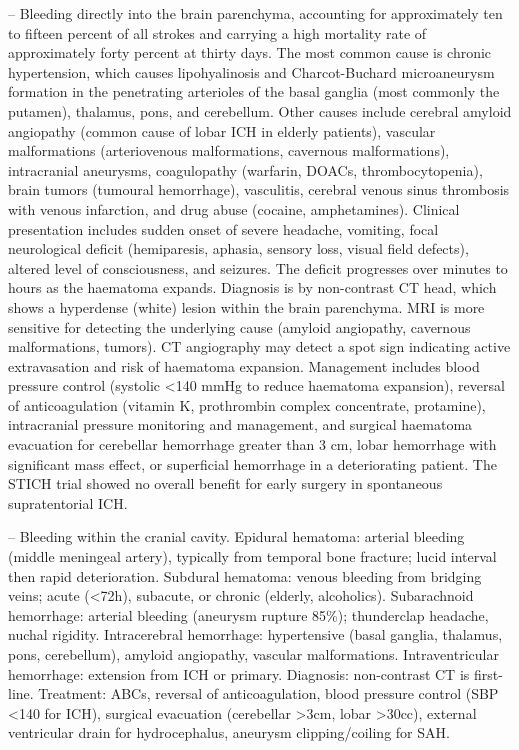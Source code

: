 -- Bleeding directly into the brain parenchyma, accounting for approximately ten to fifteen percent of all strokes and carrying a high mortality rate of approximately forty percent at thirty days. The most common cause is chronic hypertension, which causes lipohyalinosis and Charcot-Buchard microaneurysm formation in the penetrating arterioles of the basal ganglia (most commonly the putamen), thalamus, pons, and cerebellum. Other causes include cerebral amyloid angiopathy (common cause of lobar ICH in elderly patients), vascular malformations (arteriovenous malformations, cavernous malformations), intracranial aneurysms, coagulopathy (warfarin, DOACs, thrombocytopenia), brain tumors (tumoural hemorrhage), vasculitis, cerebral venous sinus thrombosis with venous infarction, and drug abuse (cocaine, amphetamines). Clinical presentation includes sudden onset of severe headache, vomiting, focal neurological deficit (hemiparesis, aphasia, sensory loss, visual field defects), altered level of consciousness, and seizures. The deficit progresses over minutes to hours as the haematoma expands. Diagnosis is by non-contrast CT head, which shows a hyperdense (white) lesion within the brain parenchyma. MRI is more sensitive for detecting the underlying cause (amyloid angiopathy, cavernous malformations, tumors). CT angiography may detect a spot sign indicating active extravasation and risk of haematoma expansion. Management includes blood pressure control (systolic <140 mmHg to reduce haematoma expansion), reversal of anticoagulation (vitamin K, prothrombin complex concentrate, protamine), intracranial pressure monitoring and management, and surgical haematoma evacuation for cerebellar hemorrhage greater than 3 cm, lobar hemorrhage with significant mass effect, or superficial hemorrhage in a deteriorating patient. The STICH trial showed no overall benefit for early surgery in spontaneous supratentorial ICH.

-- Bleeding within the cranial cavity. Epidural hematoma: arterial bleeding (middle meningeal artery), typically from temporal bone fracture; lucid interval then rapid deterioration. Subdural hematoma: venous bleeding from bridging veins; acute (<72h), subacute, or chronic (elderly, alcoholics). Subarachnoid hemorrhage: arterial bleeding (aneurysm rupture 85\%); thunderclap headache, nuchal rigidity. Intracerebral hemorrhage: hypertensive (basal ganglia, thalamus, pons, cerebellum), amyloid angiopathy, vascular malformations. Intraventricular hemorrhage: extension from ICH or primary. Diagnosis: non-contrast CT is first-line. Treatment: ABCs, reversal of anticoagulation, blood pressure control (SBP <140 for ICH), surgical evacuation (cerebellar >3cm, lobar >30cc), external ventricular drain for hydrocephalus, aneurysm clipping/coiling for SAH.

